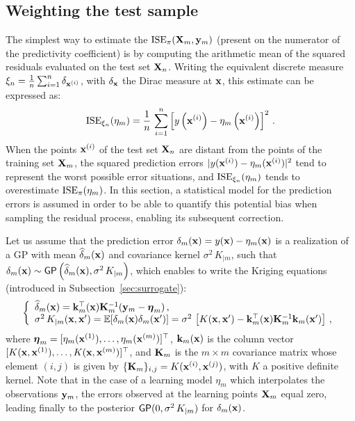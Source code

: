 \subsection{Weighting the test sample}\label{sec:weighting}

The simplest way to estimate the $\mathrm{ISE}_\pi({\bf X}_m,{\bf y}_m)$ (present on the numerator of the predictivity coefficient) is by computing the arithmetic mean of the squared residuals evaluated on the test set ${\bf X}_n$. 
Writing the equivalent discrete measure $\xi_n = \frac1n \sum_{i=1}^n \delta_{{\bf x}^{(i)}}$, with $\delta_{{\bf x}}$ the Dirac measure at ${\bf x}$, this estimate can be expressed as:
$$
\mathrm{ISE}_{\xi_n}(\eta_m) = \frac1n\, \sum_{i=1}^n \left[ y\left({\bf x}^{(i)}\right)-\eta_m\left({\bf x}^{(i)}\right)\right]^2 \,.
$$
When the points ${\bf x}^{(i)}$ of the test set ${\bf X}_n$ are distant from the points of the training set ${\bf X}_m$, the squared prediction errors $|y({\bf x}^{(i)})-\eta_m({\bf x}^{(i)})|^2$ tend to represent the worst possible error situations, and $\mathrm{ISE}_{\xi_n}(\eta_m)$ tends to overestimate $\mathrm{ISE}_\pi(\eta_m)$. 
In this section, a statistical model for the prediction errors is assumed in order to be able to quantify this potential bias when sampling the residual process, enabling its subsequent correction. 

Let us assume that the prediction error $\delta_m({\bf x})=y({\bf x})-\eta_m({\bf x})$ is a realization of a GP with mean $\widehat\delta_m({\bf x})$ and covariance kernel $\sigma^2\,K_{|m}$,
such that $\delta_m({\bf x})\sim\mathsf{GP}\left(\widehat\delta_m({\bf x}),\sigma^2\,K_{|m}\right)$, which enables to write the Kriging equations (introduced in Subsection~\ref{sec:surrogate}): 
\begin{equation}
    \left\{
    \begin{array}{ll}
        \widehat\delta_m({\bf x})=\mathbf{k}_m^\top({\bf x})\mathbf{K}_m^{-1}({\bf y}_m-\boldsymbol{\eta}_m)\, ,\\
        \sigma^2\, K_{|m}({\bf x},{\bf x}')=\mathbb{E}[\delta_m({\bf x})\delta_m({\bf x}')]=\sigma^2\,\left[K({\bf x},{\bf x}')-\mathbf{k}_m^\top({\bf x})\mathbf{K}_m^{-1}\mathbf{k}_m({\bf x}')\right]\,,
    \end{array}
\right.
\end{equation}
where $\boldsymbol{\eta}_m=[\eta_m({\bf x}^{(1)}),\ldots,\eta_m({\bf x}^{(m)})]^\top$, 
$\mathbf{k}_m({\bf x})$ is the column vector $[K({\bf x},{\bf x}^{(1)}),\ldots,K({\bf x},{\bf x}^{(m)})]^\top$,  
and $\mathbf{K}_m$ is the $m\times m$ covariance matrix whose element $(i,j)$ is given by $\{\mathbf{K}_m\}_{i,j}=K({\bf x}^{(i)},{\bf x}^{(j)})$, with $K$ a positive definite kernel. 
Note that in the case of a learning model $\eta_m$ which interpolates the observations ${\bf y}_m$, the errors observed at the learning points ${\bf X}_m$ equal zero, leading finally to the posterior $\mathsf{GP}(0,\sigma^2\,K_{|m})$ for $\delta_m({\bf x})$. 

